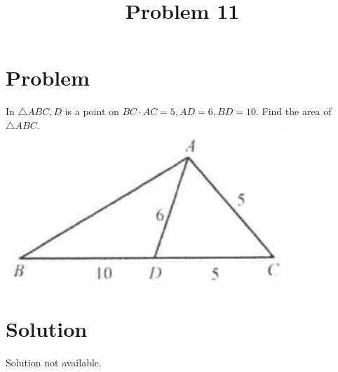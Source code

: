 \documentclass{article}
\title{Problem 11}
\date{}
\begin{document}
\maketitle

\section*{Problem}
In \(\triangle A B C, D\) is a point on \(B C \cdot A C=5, A D=6, B D=10\). Find the area of \(\triangle A B C\).\\
\centering
\includegraphics[width=\textwidth]{images/090(1).jpg}

\section*{Solution}
Solution not available.
\end{document}
